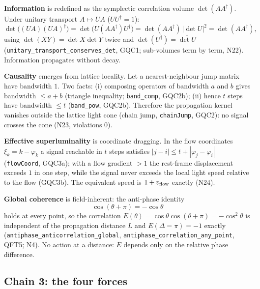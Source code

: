 \documentclass[aps,prd,preprint,superscriptaddress,amsmath,amssymb]{revtex4-2}
\begin{document}
\textbf{Information} is redefined as the symplectic correlation volume
$\det(AA^\dagger)$.  Under unitary transport
$A\mapsto UA$ ($UU^\dagger=1$):
\begin{equation}
\det\big((UA)(UA)^\dagger\big)
=\det\big(U(AA^\dagger)U^\dagger\big)
=\det(AA^\dagger)\,\big|\det U\big|^2
=\det(AA^\dagger),
\label{eq:unit}
\end{equation}
using $\det(XY)=\det X\det Y$ twice and $\det(U^\dagger)=\overline{\det U}$
(\texttt{unitary\_transport\_conserves\_det}, GQC1; sub-volumes term by
term, N22).  Information propagates without decay.

\textbf{Causality} emerges from lattice locality.  Let a
nearest-neighbour jump matrix have bandwidth $1$.  Two facts:
(i) composing operators of bandwidth $a$ and $b$ gives bandwidth
$\le a+b$ (triangle inequality; \texttt{band\_comp}, GQC2b);
(ii) hence $t$ steps have bandwidth $\le t$ (\texttt{band\_pow}, GQC2b).
Therefore the propagation kernel vanishes outside the lattice light cone
(chain jump, \texttt{chainJump}, GQC2): no signal crosses the cone
(N23, violations $0$).

\textbf{Effective superluminality} is coordinate dragging.  In the flow
coordinates $\xi_k=k-\varphi_k$ a signal reachable in $t$ steps satisfies
$|j-i|\le t+|\varphi_j-\varphi_i|$ (\texttt{flowCoord}, GQC3a); with a
flow gradient $>1$ the rest-frame displacement exceeds $1$ in one step,
while the signal never exceeds the local light speed relative to the flow
(GQC3b).  The equivalent speed is $1+v_{\rm flow}$ exactly (N24).

\textbf{Global coherence} is field-inherent: the anti-phase identity
\begin{equation}
\cos(\theta+\pi)=-\cos\theta
\label{eq:antiphase}
\end{equation}
holds at every point, so the correlation
$E(\theta)=\cos\theta\cos(\theta+\pi)=-\cos^2\theta$ is independent of
the propagation distance $L$ and $E(\Delta=\pi)=-1$ exactly
(\texttt{antiphase\_anticorrelation\_global}, \texttt{antiphase\_correlation\_any\_point},
QFT5; N4).  No action at a distance: $E$ depends only on the relative
phase difference.

\subsection{Chain 3: the four forces}
\label{app:chain3}
\end{document}
